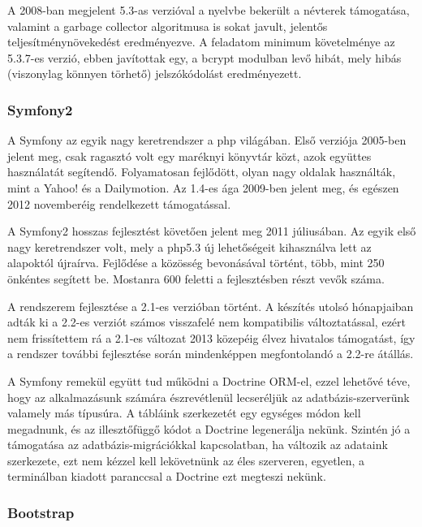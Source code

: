 \documentclass[a4paper,12pt,oneside]{report}
\begin{document}
A 2008-ban megjelent 5.3-as verzióval a nyelvbe bekerült a névterek támogatása, valamint a garbage collector algoritmusa is sokat javult, jelentős teljesítmény\-növe\-kedést eredményezve. A feladatom minimum követelménye az 5.3.7-es verzió, ebben javítottak egy, a bcrypt modulban levő hibát, mely hibás (viszonylag könnyen törhető) jelszókódolást eredményezett.

\subsubsection{Symfony2}

A Symfony az egyik nagy keretrendszer a php világában. Első verziója 2005-ben jelent meg\cite{book:gentle_introduction}, csak ragasztó volt egy maréknyi könyvtár közt, azok együttes használatát segítendő. Folyamatosan fejlődött, olyan nagy oldalak hasz\-nálták, mint a Yahoo!\cite{website:symfony_yahoo} és a Dailymotion\cite{website:symfony_dailymotion}. Az 1.4-es ága 2009-ben jelent meg, és egészen 2012 novemberéig rendelkezett támogatással.

A Symfony2 hosszas fejlesztést követően jelent meg 2011 júliusában. Az egyik első nagy keretrendszer volt, mely a php5.3 új lehetőségeit kihasználva lett az alapoktól újraírva. Fejlődése a közösség bevonásával történt, több, mint 250 önkéntes segített be. Mostanra 600 feletti a fejlesztésben részt vevők száma.

A rendszerem fejlesztése a 2.1-es verzióban történt. A készítés utolsó hónapjaiban adták ki a 2.2-es verziót számos visszafelé nem kompatibilis változtatással, ezért nem frissítettem rá \textendash{} a 2.1-es változat 2013 közepéig élvez hivatalos támogatást, így a rendszer további fejlesztése során mindenképpen megfontolandó a 2.2-re átállás.

A Symfony remekül együtt tud működni a Doctrine ORM-el\cite{website:doctrine}\cite{book:doctrine_orm}, ezzel lehetővé téve, hogy az alkalmazásunk számára észrevétlenül lecseréljük az adatbázis-szerverünk valamely más típusúra. A tábláink szerkezetét egy egységes módon kell megadnunk, és az illesztőfüggő kódot a Doctrine legenerálja nekünk. Szintén jó a támogatása az adatbázis-migrációkkal kapcsolatban, ha változik az adataink szerkezete, ezt nem kézzel kell lekövetnünk az éles szerveren, egyetlen, a terminálban kiadott paranccsal a Doctrine ezt megteszi nekünk.

\subsubsection{Bootstrap}
\end{document}
